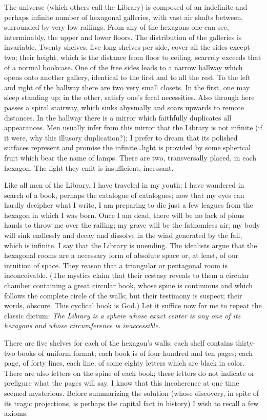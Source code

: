 \documentclass[oneside]{book}
\begin{document}
The universe (which others call the Library) is composed of an indefinite and perhaps infinite number of hexagonal galleries, with vast air shafts between, surrounded by very low railings. From any of the hexagons one can see, interminably, the upper and lower floors. The distribution of the galleries is invariable. Twenty shelves, five long shelves per side, cover all the sides except two; their height, which is the distance from floor to ceiling, scarcely exceeds that of a normal bookcase. One of the free sides leads to a narrow hallway which opens onto another gallery, identical to the first and to all the rest. To the left and right of the hallway there are two very small closets. In the first, one may sleep standing up; in the other, satisfy one's fecal necessities. Also through here passes a spiral stairway, which sinks abysmally and soars upwards to remote distances. In the hallway there is a mirror which faithfully duplicates all appearances. Men usually infer from this mirror that the Library is not infinite (if it were, why this illusory duplication?); I prefer to dream that its polished surfaces represent and promise the infinite\dots light is provided by some spherical fruit which bear the name of lamps. There are two, transversally placed, in each hexagon. The light they emit is insufficient, incessant.

Like all men of the Library, I have traveled in my youth; I have wandered in search of a book, perhaps the catalogue of catalogues; now that my eyes can hardly decipher what I write, I am preparing to die just a few leagues from the hexagon in which I was born. Once I am dead, there will be no lack of pious hands to throw me over the railing; my grave will be the fathomless air; my body will sink endlessly and decay and dissolve in the wind generated by the fall, which is infinite. I say that the Library is unending. The idealists argue that the hexagonal rooms are a necessary form of absolute space or, at least, of our intuition of space. They reason that a triangular or pentagonal room is inconceivable. (The mystics claim that their ecstasy reveals to them a circular chamber containing a great circular book, whose spine is continuous and which follows the complete circle of the walls; but their testimony is suspect; their words, obscure. This cyclical book is God.) Let it suffice now for me to repeat the classic dictum: \emph{The Library is a sphere whose exact center is any one of its hexagons and whose circumference is inaccessible.}

There are five shelves for each of the hexagon's walls; each shelf contains thirty-two books of uniform format; each book is of four hundred and ten pages; each page, of forty lines, each line, of some eighty letters which are black in color. There are also letters on the spine of each book; these letters do not indicate or prefigure what the pages will say. I know that this incoherence at one time seemed mysterious. Before summarizing the solution (whose discovery, in spite of its tragic projections, is perhaps the capital fact in history) I wish to recall a few axioms.
\end{document}

